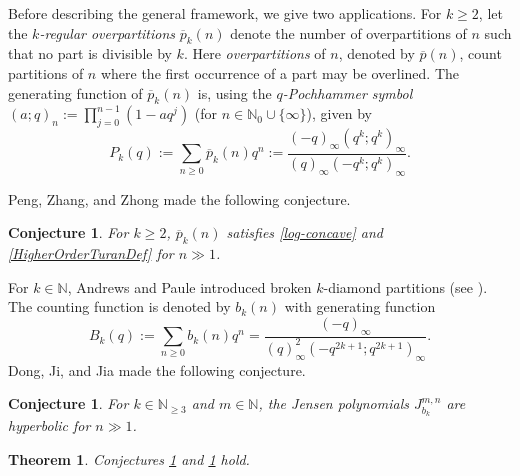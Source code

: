 \documentclass[11pt,reqno,a4paper]{amsart}
\renewcommand{\(}{\left\(}
\renewcommand{\)}{\right\)}
\numberwithin{equation}{section}
\theoremstyle{plain}
\newtheorem{theorem}{Theorem}[section]
\theoremstyle{definition} %
\newcounter{specialstatement}
\newtheorem{conjecture}[specialstatement]{Conjecture}
\numberwithin{equation}{section}
\begin{document}
 Before describing the general framework, we give two applications. For $k\ge 2$, let the {\it $k$-regular overpartitions} $\overline{p}_k(n)$ denote the number of overpartitions of $n$ such that no part is divisible by $k$.  Here {\it overpartitions} of $n$, denoted by $\overline{p}(n)$, count partitions of $n$ where the first occurrence of a part may be overlined. The generating function of $\overline{p}_k(n)$ is, using the {\it $q$-Pochhammer symbol} $(a;q)_n\!:=\!\prod_{j=0}^{n-1}\left(1\!-\!a q^j\right)$ (for $n \in \mathbb{N}_0\cup \{\infty\}$), given by 
\begin{equation}\label{genfunc1}
P_k(q):=\sum_{n\ge 0}\overline{p}_k(n)q^n:=\frac{(-q)_{\infty}\left(q^k;q^k\right)_{\infty}}{(q)_{\infty}\left(-q^k;q^k\right)_{\infty}}.
\end{equation}



 Peng, Zhang, and Zhong \cite[Conjecture 5.1]{PZZ} made the following conjecture. 
\begin{conjecture}\label{conj0}
 {\it For $k\ge 2$, $\overline{p}_k(n)$ satisfies \eqref{log-concave} and \eqref{HigherOrderTuranDef} for $n\gg 1$.} %
\end{conjecture}
For $k\in \mathbb{N}$, Andrews and Paule \cite{AP} introduced broken $k$-diamond partitions (see \cite[Definition 4]{AP}). The counting function is denoted by $b_k(n)$ with generating function 
\begin{equation}\label{genfunc2}
B_k(q):=\sum_{n\ge 0}b_k(n)q^n=\frac{\left(-q\right)_{\infty}}{\left(q\right)^2_{\infty}\left(-q^{2k+1};q^{2k+1}\right)_{\infty}}.
\end{equation}
Dong, Ji, and Jia \cite[p. 614]{DJJ} made the following conjecture.
\begin{conjecture}\label{conj1}
{\it 	For $k\in \mathbb{N}_{\ge 3}$ and $m\in \mathbb{N}$, the Jensen polynomials $J^{m,n}_{b_k}$ are hyperbolic for $n\!\gg\!1$.} %
\end{conjecture}
\begin{theorem}\label{ConjThm1} 
Conjectures \ref{conj0} and \ref{conj1} hold. 
\end{theorem}
\end{document}
